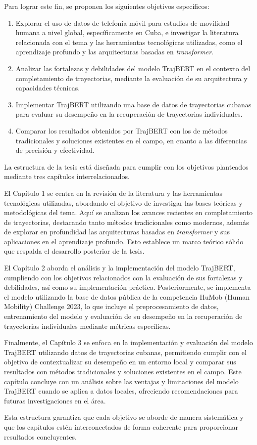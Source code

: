  Para lograr este fin, se proponen los siguientes objetivos específicos:

 \begin{enumerate}
    \item Explorar el uso de datos de telefonía móvil para estudios de movilidad humana a nivel global, específicamente en Cuba, e investigar la literatura relacionada con el tema y las herramientas tecnológicas utilizadas, como el aprendizaje profundo y las arquitecturas basadas en \textit{transformer}.
    \item Analizar las fortalezas y debilidades del modelo TrajBERT en el contexto del completamiento de trayectorias, mediante la evaluación de su arquitectura y capacidades técnicas.
    \item Implementar TrajBERT utilizando una base de datos de trayectorias cubanas para evaluar su desempeño en la recuperación de trayectorias individuales.
    \item Comparar los resultados obtenidos por TrajBERT con los de métodos tradicionales y soluciones existentes en el campo, en cuanto a las diferencias de precisión y efectividad.
\end{enumerate}

La estructura de la tesis está diseñada para cumplir con los objetivos planteados mediante tres capítulos interrelacionados.

El Capítulo 1 se centra en la revisión de la literatura y las herramientas tecnológicas utilizadas, abordando el objetivo de investigar las bases teóricas y metodológicas del tema. Aquí se analizan los avances recientes en completamiento de trayectorias, destacando tanto métodos tradicionales como modernos, además de explorar en profundidad las arquitecturas basadas en \textit{transformer} y sus aplicaciones en el aprendizaje profundo. Esto establece un marco teórico sólido que respalda el desarrollo posterior de la tesis.

El Capítulo 2 aborda el análisis y la implementación del modelo TrajBERT, cumpliendo con los objetivos relacionados con la evaluación de sus fortalezas y debilidades, así como su implementación práctica. Posteriormente, se implementa el modelo utilizando la base de datos pública de la competencia HuMob (Human Mobility) Challenge 2023, lo que incluye el preprocesamiento de datos, entrenamiento del modelo y evaluación de su desempeño en la recuperación de trayectorias individuales mediante métricas específicas.

Finalmente, el Capítulo 3 se enfoca en la implementación y evaluación del modelo TrajBERT utilizando datos de trayectorias cubanas, permitiendo cumplir con el objetivo de contextualizar su desempeño en un entorno local y comparar sus resultados con métodos tradicionales y soluciones existentes en el campo. Este capítulo concluye con un análisis sobre las ventajas y limitaciones del modelo TrajBERT cuando se aplica a datos locales, ofreciendo recomendaciones para futuras investigaciones en el área.

Esta estructura garantiza que cada objetivo se aborde de manera sistemática y que los capítulos estén interconectados de forma coherente para proporcionar resultados concluyentes.